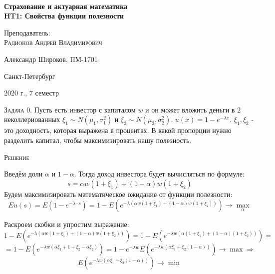 \documentclass[%
12pt, %
final, %
oneside, %
onecolumn, %
centertags]{article} %
\theoremstyle{plain}
\theoremstyle{definition}
\theoremstyle{remark}
\begin{document}
\begin{titlepage} 
\begin{center}
\textbf{}\\[10.0cm]
\textbf{\LARGE Страхование и актуарная математика}\\[0.5cm]
\textbf{\Large HT1: Свойства функции полезности} \\[0.2cm]


\begin{center} \large
{Преподаватель:} \\[0.5cm]
\textsc {Радионов Андрей Владимирович}\\
\end{center}

\vfill 



{\large {Александр Широков, ПМ-1701}} \par
{\large {Санкт-Петербург}} \par
{\large {2020 г., 7 семестр}} 

\end{center} 
\end{titlepage}

\newpage

\textsc{Задача 0.}
Пусть есть инвестор с капиталом $w$ и он может вложить деньги в $2$ неколлериованных $\xi_1 \sim N(\mu_1,\sigma_1^2)$ и $\xi_2 \sim N(\mu_2,\sigma_2^2)$. $u(x) = 1 - e^{-\lambda x}$. $\xi_1,\xi_2$ - это доходность, которая выражена в процентах.  В какой пропорции нужно разделить капитал, чтобы максимизировать нашу полезность.

\textsc{Решение}

Введём доли $\alpha$ и $1-\alpha$. Тогда доход инвестора будет вычисляться по формуле:
$$s = \alpha w (1+\xi_1) + (1-\alpha)w(1+\xi_2)$$
Будем максимизировать математическое ожидание от функции полезности:
$$Eu(s) = E (1-e^{-\lambda \cdot s}) = 1 - E \left(e^{-\lambda \left(\alpha w (1+\xi_1) + (1-\alpha)w(1+\xi_2)\right)}\right) \to \underset{\alpha}{\max}$$

Раскроем скобки и упростим выражение:
$$1 - E \left(e^{-\lambda \left(\alpha w (1+\xi_1) + (1-\alpha)w(1+\xi_2)\right)}\right) = 1 - E \left(e^{-\lambda w \left(\alpha(1+\xi_1) + (1-\alpha)(1+\xi_2)\right)}\right) = $$
$$ = 1 - E\left(e^{-\lambda w (\alpha\xi_1 + 1 + \xi_2 - \alpha \xi_2)}\right) = 1 - e^{-\lambda w}E\left(e^{-\lambda w (\alpha \xi_1 + \xi_2 (1-\alpha))}\right) \to \max \Rightarrow$$
$$E\left(e^{-\lambda w (\alpha \xi_1 + \xi_2 (1-\alpha))}\right) \to \min$$
\end{document}
